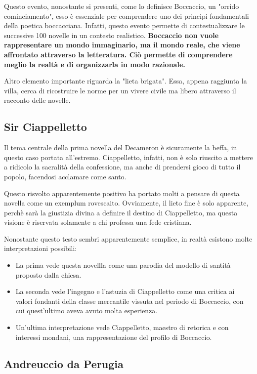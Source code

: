 \documentclass[10pt,a4paper]{article}
\begin{document}
Questo evento, nonostante si presenti, come lo definisce Boccaccio, un "orrido cominciamento", esso è essenziale per comprendere uno dei principi fondamentali della poetica boccacciana. Infatti, questo evento permette di contestualizzare le successive 100 novelle in un contesto realistico. \textbf{Boccaccio non vuole rappresentare un mondo immaginario, ma il mondo reale, che viene affrontato attraverso la letteratura. Ciò permette di comprendere meglio la realtà e di organizzarla in modo razionale.}

Altro elemento importante riguarda la "lieta brigata". Essa, appena raggiunta la villa, cerca di ricostruire le norme per un vivere civile ma libero attraverso il racconto delle novelle.

\subsection{Sir Ciappelletto}

Il tema centrale della prima novella del Decameron è sicuramente la beffa, in questo caso portata all'estremo. Ciappelletto, infatti, non è solo riuscito a mettere a ridicolo la sacralità della confessione, ma anche di prendersi gioco di tutto il popolo, facendosi acclamare come santo.

Questo risvolto apparentemente positivo ha portato molti a pensare di questa novella come un exemplum rovescaito. Ovviamente, il lieto fine è solo apparente, perchè sarà la giustizia divina a definire il destino di Ciappelletto, ma questa visione è riservata solamente a chi professa una fede cristiana.

Nonostante questo testo sembri apparentemente semplice, in realtà esistono molte interpretazioni possibili:
\begin{itemize}
	\item La prima vede questa novellla come una parodia del modello di santità proposto dalla chiesa.
	\item La seconda vede l'ingegno e l'astuzia di Ciappelletto come una critica ai valori fondanti della classe mercantile vissuta nel periodo di Boccaccio, con cui quest'ultimo aveva avuto molta esperienza.
	\item Un'ultima interpretazione vede Ciappelletto, maestro di retorica e con interessi mondani, una rappresentazione del profilo di Boccaccio.
\end{itemize}

\subsection{Andreuccio da Perugia}
\end{document}

